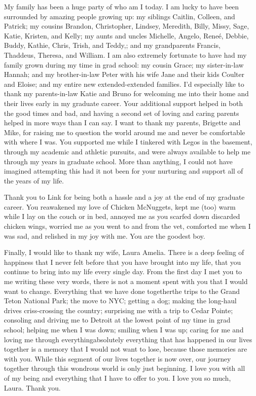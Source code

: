 \begin{acknowledge}
My family has been a huge party of who am I today. I am lucky to have
been surrounded by amazing people growing up: my siblings Caitlin,
Colleen, and Patrick; my cousins Brandon, Christopher, Lindsey,
Meredith, Billy, Missy, Sage, Katie, Kristen, and Kelly; my aunts and
uncles Michelle, Angelo, Rene\'{e}, Debbie, Buddy, Kathie, Chris, Trish,
and Teddy,; and my grandparents Francis, Thaddeus, Theresa, and William.
I am also extremely fortunate to have had my family grown during my time
in grad school: my cousin Grace; my sister-in-law Hannah; and my
brother-in-law Peter with his wife Jane and their kids Coulter and
Eloise; and my entire new extended-extended families. I'd especially
like to thank my parents-in-law Katie and Bruno for welcoming me into
their home and their lives early in my graduate career. Your additional
support helped in both the good times and bad, and having a second set
of loving and caring parents helped in more ways than I can say. I want
to thank my parents, Brigette and Mike, for raising me to question the
world around me and never be comfortable with where I was. You supported
me while I tinkered with Legos in the basement, through my academic and
athletic pursuits, and were always available to help me through my years
in graduate school. More than anything, I could not have imagined
attempting this had it not been for your nurturing and support all of
the years of my life.

Thank you to Link for being both a hassle and a joy at the end of my
graduate career. You reawakened my love of Chicken McNuggets, kept me
(too) warm while I lay on the couch or in bed, annoyed me as you scarfed
down discarded chicken wings, worried me as you went to and from the
vet, comforted me when I was sad, and relished in my joy with me. You
are the goodest boy.

Finally, I would like to thank my wife, Laura Amelia. There is a deep
feeling of happiness that I never felt before that you have brought into
my life, that you continue to bring into my life every single day. From
the first day I met you to me writing these very words, there is not a
moment spent with you that I would want to change. Everything that we
have done together\textemdash{}the trips to the Grand Teton National
Park; the move to NYC; getting a dog; making the long-haul drives
criss-crossing the country; surprising me with a trip to Cedar Pointe;
consoling and driving me to Detroit at the lowest point of my time in
grad school; helping me when I was down; smiling when I was up; caring
for me and loving me through everything\textemdash{}absolutely
everything that has happened in our lives together is a memory that I
would not want to lose, because those memories are with you. While this
segment of our lives together is now over, our journey together through
this wondrous world is only just beginning. I love you with all of my
being and everything that I have to offer to you. I love you so much,
Laura. Thank you.

\end{acknowledge}
